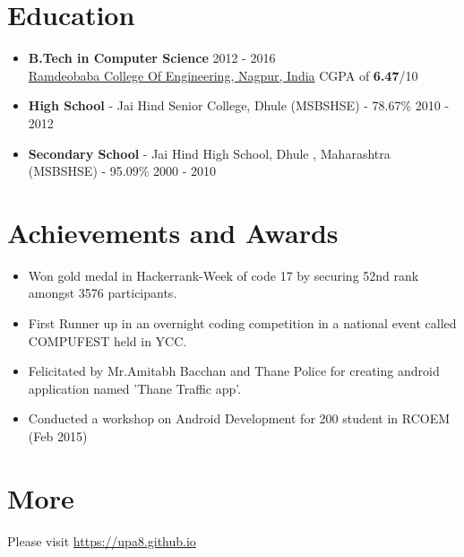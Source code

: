 \documentclass[margin, centered]{res}
\begin{document}
\begin{resume}
\section{Education}
\begin{itemize}[leftmargin=*]\item
\textbf{B.Tech in Computer Science} \hfill 2012 - 2016 \\
\href{http://rknec.edu}{Ramdeobaba College Of Engineering, Nagpur, India}
  CGPA of \textbf{6.47}/10
\item\textbf{High School} - {Jai Hind Senior College, Dhule} (MSBSHSE) - 78.67\% \hfill 2010 - 2012 \
\item\textbf{Secondary School} - Jai Hind High School, Dhule , Maharashtra (MSBSHSE) - 95.09\% \hfill 2000 - 2010
\end{itemize}

\section{Achievements and Awards}
\begin{itemize}[leftmargin=*]
 \item Won gold medal in Hackerrank-Week of code 17 by securing 52nd rank amongst 3576 participants. 
 \item First Runner up in an overnight coding competition in a national event called COMPUFEST held in YCC.
 \item Felicitated by Mr.Amitabh Bacchan and Thane Police for creating android application named 'Thane Traffic 
app'.
\item 
 Conducted a workshop on Android Development for 200 student in RCOEM (Feb 2015)
\end{itemize}

\section{More}
Please visit \href{https://upa8.github.io}{https://upa8.github.io}
\end{resume}
\end{document}
